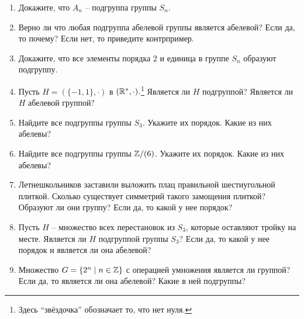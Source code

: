 \begin{enumerate}
    \item Докажите, что $A_n$ -- подгруппа группы $S_n$.
    \item Верно ли что любая подгруппа абелевой группы является абелевой?
        Если да, то почему? Если нет, то приведите контрпример.
    \item Докажите, что все элементы порядка $2$ и единица в группе $S_n$ образуют подгруппу. 
    \item Пусть $H = (\{-1, 1\}, \cdot)$ в $(\mathbb R^*, \cdot).$\footnote{
        Здесь ``звёздочка'' обозначает то, что нет нуля.}
        Является ли $H$ подгруппой?
        Является ли $H$ абелевой группой?
    \item Найдите все подгруппы группы $S_3$. Укажите их порядок. 
        Какие из них абелевы?
    \item Найдите все подгруппы группы $\mathbb Z/(6)$. Укажите их порядок. 
        Какие из них абелевы?
    \item Летнешкольников заставили выложить плац правильной шестиугольной плиткой. 
        Сколько существует симметрий такого замощения плиткой? Образуют ли они группу?
        Если да, то какой у нее порядок?
    \item Пусть $H$ -- множество всех перестановок из $S_3$, которые оставляют
        тройку на месте. Является ли $H$ подгруппой группы $S_3$?
        Если да, то какой у нее порядок и является ли она абелевой?
    \item Множество $G = \{2^n \mid n \in \mathbb Z\}$ с операцией умножения является ли группой?
        Если да, то является ли она абелевой? Какие в ней подгруппы?
\end{enumerate}
